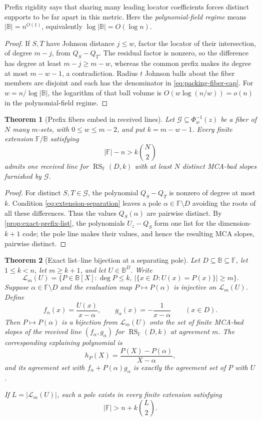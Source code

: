 \documentclass[11pt,a4paper]{amsart}
\numberwithin{equation}{section}
\newtheorem{theorem}{Theorem}[section]
\theoremstyle{remark}
\DeclareMathOperator{\RS}{RS}
\newcommand{\F}{\mathbb F}
\newcommand{\B}{\mathbb B}
\newcommand{\Lcal}{\mathcal L}
\newcommand{\abs}[1]{\lvert #1\rvert}
\begin{document}
Prefix rigidity says that sharing many leading locator coefficients forces
distinct supports to be far apart in this metric.  Here the
\emph{polynomial-field regime} means \(\abs\B=n^{O(1)}\), equivalently
\(\log\abs\B=O(\log n)\).

\begin{proof}
If \(S,T\) have Johnson distance \(j\le w\), factor the locator of their
intersection, of degree \(m-j\), from \(Q_S-Q_T\).  The residual factor is
nonzero, so the difference has degree at least \(m-j\ge m-w\), whereas the
common prefix makes its degree at most \(m-w-1\), a contradiction.  Radius
\(t\) Johnson balls about the fiber members are disjoint and each has the
denominator in \eqref{eq:packing-fiber-cap}.  For
\(w=n/\log\abs\B\), the logarithm of that ball volume is
\(O(w\log(n/w))=o(n)\) in the polynomial-field regime.
\end{proof}

\begin{theorem}[Prefix fibers embed in received lines]
\label{thm:prefix-to-line-hardness}
Let \(\mathcal G\subseteq\Phi_w^{-1}(z)\) be a fiber of \(N\) many
\(m\)-sets, with \(0\le w\le m-2\), and put \(k=m-w-1\).  Every finite
extension \(\F/\B\) satisfying
\[
        \abs\F-n>k\binom N2
        \tag{4.5}\label{eq:extension-separation}
\]
admits one received line for \(\RS_\F(D,k)\) with at least \(N\) distinct
MCA-bad slopes furnished by \(\mathcal G\).
\end{theorem}

\begin{proof}
For distinct \(S,T\in\mathcal G\), the polynomial \(Q_S-Q_T\) is nonzero
of degree at most \(k\).  Condition \eqref{eq:extension-separation} leaves a
pole \(\alpha\in\F\setminus D\) avoiding the roots of all these
differences.  Thus the values \(Q_S(\alpha)\) are pairwise distinct.  By
\cref{prop:exact-prefix-list}, the polynomials \(U_z-Q_S\) form one list for
the dimension-\(k+1\) code; the pole line makes their values, and hence the
resulting MCA slopes, pairwise distinct.
\end{proof}

\begin{theorem}[Exact list--line bijection at a separating pole]
\label{thm:exact-list-line-bijection}
Let \(D\subseteq\B\subseteq\F\), let \(1\le k<n\), let \(m\ge k+1\),
and let \(U\in\B^D\).  Write
\[
 \Lcal_m(U)=\{P\in\B[X]:\deg P\le k,
       \ \abs{\{x\in D:U(x)=P(x)\}}\ge m\}.
\]
Suppose \(\alpha\in\F\setminus D\) and the evaluation map
\(P\mapsto P(\alpha)\) is injective on \(\Lcal_m(U)\).  Define
\[
 f_\alpha(x)=\frac{U(x)}{x-\alpha},\qquad
 g_\alpha(x)=-\frac1{x-\alpha}\qquad(x\in D).
\]
Then \(P\mapsto P(\alpha)\) is a bijection from \(\Lcal_m(U)\) onto
the set of finite MCA-bad slopes of the received line
\((f_\alpha,g_\alpha)\) for \(\RS_\F(D,k)\) at agreement \(m\).  The
corresponding explaining polynomial is
\[
       h_P(X)=\frac{P(X)-P(\alpha)}{X-\alpha},
\]
and its agreement set with
\(f_\alpha+P(\alpha)g_\alpha\) is exactly the agreement set of \(P\)
with \(U\).

If \(L=\abs{\Lcal_m(U)}\), such a pole exists in every finite extension
satisfying
\[
       \abs\F>n+k\binom L2.                         \tag{4.6}
\]
\end{theorem}
\end{document}
